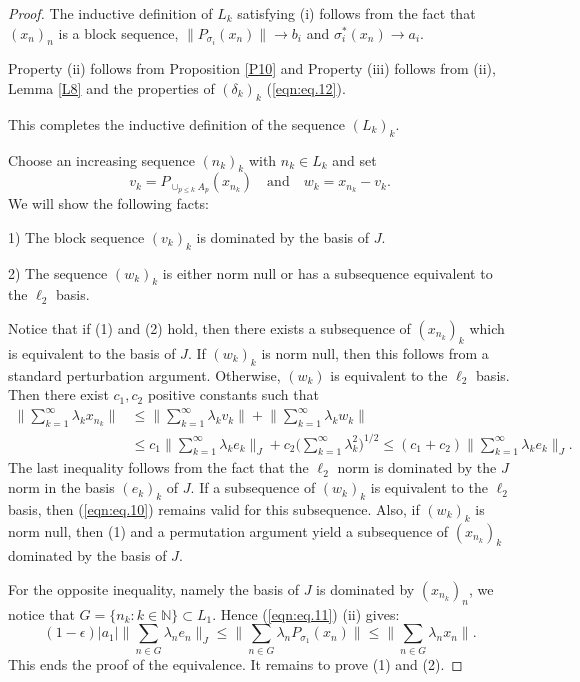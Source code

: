 \documentclass[12pt]{amsart}
\theoremstyle{plain}
\numberwithin{equation}{section}
\newcommand{\N}{\mathbb{N}}
\newcommand{\s}{\sigma}
\begin{document}
\begin{proof}
The inductive definition of $L_k$ satisfying (i) follows from the fact that $(x_n)_n$ is a block sequence, $\|P_{\s_i}(x_n)\| \to b_i$ and $\s_i^*(x_n) \to a_i$.

Property (ii) follows from Proposition \ref{P10} and Property (iii) follows from (ii), Lemma \ref{L8} and the properties of $(\delta_k)_k$ (\ref{eqn:eq.12}).

This completes the inductive definition of the sequence $(L_k)_k$.

Choose an increasing sequence $(n_k)_k$ with $n_k\in L_k$ and set
\[ v_k = P_{\cup_{p\leq k} A_p}(x_{n_k}) \quad \text{and} \quad w_k = x_{n_k} - v_k. \]
We will show the following facts:

1) The block sequence $(v_k)_k$ is dominated by the basis of $J$.

2) The sequence $(w_k)_k$ is either norm null or has a subsequence equivalent to the $\ell_2$ basis.

Notice that if (1) and (2) hold, then there exists a subsequence of $(x_{n_k})_k$ which is equivalent to the basis of $J$. If $(w_k)_k$ is norm null, then this follows from a standard perturbation argument. 
Otherwise, $(w_k)$ is equivalent to the $\ell_2$ basis. Then there exist $c_1, c_2$ positive constants such that
\begin{equation}\label{eqn:eq.10}
\begin{split}
\Big\|\sum_{k=1}^\infty\lambda_k x_{n_k} \Big\| &\leq \Big\| \sum_{k=1}^\infty\lambda_k v_k \Big\| + \Big\| \sum_{k=1}^\infty\lambda_k w_k \Big\| \\
&\leq c_1 \Big\| \sum_{k=1}^\infty\lambda_k e_k \Big\|_J + c_2\Big( \sum_{k=1}^\infty\lambda_k^2 \Big)^{1/2} \leq (c_1+c_2)\Big\| \sum_{k=1}^\infty\lambda_k e_k \Big\|_J.
\end{split}
\end{equation}
The last inequality follows from the fact  that the $\ell_2$ norm is dominated by the $J$ norm in the basis $(e_k)_k$ of $J$. If a subsequence of $(w_k)_k$ is equivalent to the $\ell_2$ basis, then (\ref{eqn:eq.10}) remains valid for this subsequence. Also, if $(w_k)_k$ is norm null, then (1) and a permutation argument yield a subsequence of $(x_{n_k})_k$ dominated by the basis of $J$.

For the opposite inequality, namely the basis of $J$ is dominated by $(x_{n_k})_n$, we notice that $G = \{n_k : k\in\N\} \subset L_1$. Hence (\ref{eqn:eq.11}) (ii) gives:
\[ (1-\epsilon) |a_1| \Big\| \sum_{n\in G}\lambda_ne_n \Big\|_J \leq \Big\| \sum_{n\in G} \lambda_nP_{\s_1}(x_n) \Big\| \leq \Big\| \sum_{n\in G} \lambda_nx_n \Big\|. \]
This ends the proof of the equivalence. It remains to prove (1) and (2).


\end{proof}
\end{document}
